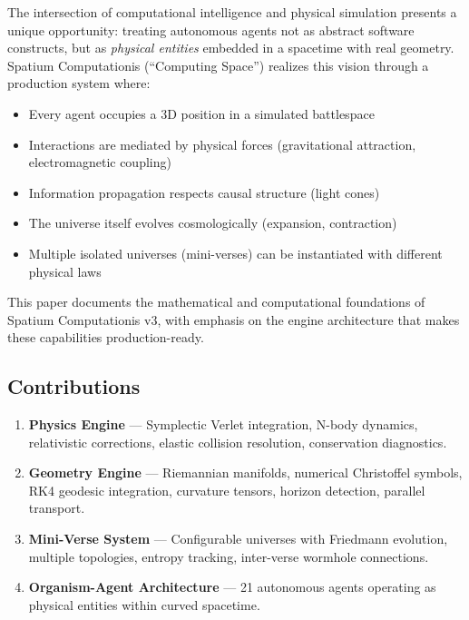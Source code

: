 \documentclass[12pt, a4paper]{article}
\begin{document}
The intersection of computational intelligence and physical simulation presents
a unique opportunity: treating autonomous agents not as abstract software
constructs, but as \emph{physical entities} embedded in a spacetime with real
geometry. Spatium Computationis (``Computing Space'') realizes this vision through
a production system where:

\begin{itemize}
    \item Every agent occupies a 3D position in a simulated battlespace
    \item Interactions are mediated by physical forces (gravitational attraction,
          electromagnetic coupling)
    \item Information propagation respects causal structure (light cones)
    \item The universe itself evolves cosmologically (expansion, contraction)
    \item Multiple isolated universes (mini-verses) can be instantiated with
          different physical laws
\end{itemize}

This paper documents the mathematical and computational foundations of
Spatium Computationis v3, with emphasis on the engine architecture that
makes these capabilities production-ready.

\subsection{Contributions}

\begin{enumerate}
    \item \textbf{Physics Engine} — Symplectic Verlet integration, N-body
          dynamics, relativistic corrections, elastic collision resolution,
          conservation diagnostics.
    \item \textbf{Geometry Engine} — Riemannian manifolds, numerical
          Christoffel symbols, RK4 geodesic integration, curvature tensors,
          horizon detection, parallel transport.
    \item \textbf{Mini-Verse System} — Configurable universes with Friedmann
          evolution, multiple topologies, entropy tracking, inter-verse
          wormhole connections.
    \item \textbf{Organism-Agent Architecture} — 21 autonomous agents
          operating as physical entities within curved spacetime.
\end{enumerate}
\end{document}
